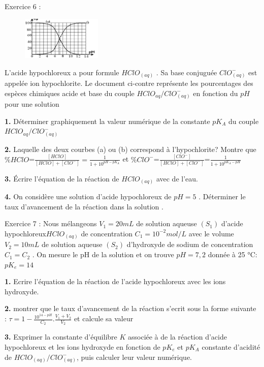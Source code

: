 \documentclass[12pt, french]{article}
\begin{document}
\begin{Box2}{Exercice 6 : }

	\begin{figure}
  \begin{center}
	  \vspace{-0.6cm}
	\includegraphics[width=0.34\textwidth]{./img/ex_05.png}
  \end{center}
\end{figure}
	L’acide hypochloreux a pour formule $HClO_{(aq)}$ . Sa base conjuguée $ClO^-_{(aq)}$ est appelée ion hypochlorite. Le document ci-contre représente les pourcentages des espèces chimiques acide et base du couple $HClO_{aq}/ClO^-_{(aq)}$ en fonction du $pH$ pour une solution

	\textbf{1. }Déterminer graphiquement la valeur numérique de la constante $pK_A$ du couple $HClO_{aq}/ClO^-_{(aq)}$

	\textbf{2. }Laquelle des deux courbes (a) ou (b) correspond à l'hypochlorite? Montre que
 $\%HClO$=$ \frac{[HClO]}{[HClO] + [ClO^-]} = \frac{1}{ 1 + 10^{pH -pK_A}}$
et $\%ClO^-$=$\frac{[ClO^-]}{[HClO] + [ClO^-]}$=$ \frac{1}{ 1 + 10^{pK_A - pH}}$

\textbf{3. }Écrire l'équation de la réaction de $HClO_{(aq)}$
avec de l'eau.

\textbf{4. }On considère une solution d'acide hypochloreux de
$pH=5$ . Déterminer le taux d’avancement de la réaction
dans la solution .
\end{Box2}


\begin{Box2}{Exercice 7 : }
Nous mélangeons $V_1 =20mL$ de solution aqueuse $(S_1)$ d'acide hypochloreux$HClO_{(aq)}$ de concentration $C_1=10^{-2}mol/L$ avec le volume $V_2=10mL$
de solution aqueuse $(S_2)$ d'hydroxyde de sodium de concentration $C_1=C_2$
. On mesure le pH de la solution et on trouve $pH =7,2$ donnée à 25 °C: $pK_e=14$

\textbf{1. }Ecrire l'équation de la réaction de l'acide hypochloreux
avec les ions hydroxyde.

\textbf{2. }montrer que le taux d’avancement de la réaction s’ecrit sous la forme suivante : $\tau = 1-\frac{10^{14 - pH}}{C_2}.\frac{V_1 + V_2}{V_2}$
et calcule sa valeur

\textbf{3. }Exprimer la constante d'équilibre $K$ associée à de la
réaction d'acide hypochloreux et les ions hydroxyde en fonction de $pK_e$ et $pK_A$ constante d'acidité de $HClO_{(aq)}/ClO^-_{(aq)}$, puis calculer leur valeur numérique. 

\end{Box2}
\end{document}
